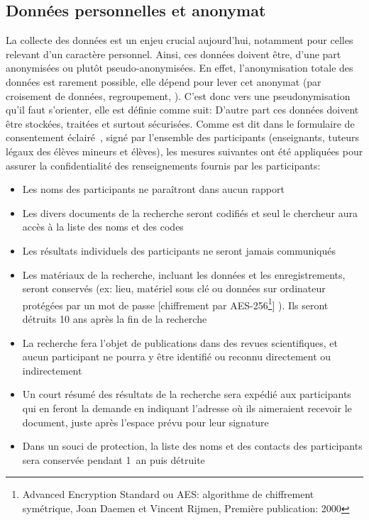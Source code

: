   \subsection{Données personnelles et anonymat}\label{sec:data}
    La collecte des données est un enjeu crucial aujourd'hui, notamment pour celles relevant d'un caractère personnel. Ainsi, ces données doivent être, d'une part anonymisées ou plutôt pseudo-anonymisées. En effet, l'anonymisation totale des données est rarement possible, elle dépend  pour lever cet anonymat (\eg par croisement de données, regroupement, \etc). C'est donc vers une pseudonymisation qu'il faut s'orienter, elle est définie comme suit:
    D'autre part ces données doivent être stockées, traitées et surtout sécurisées. Comme est dit dans le formulaire de consentement éclairé~, signé par l'ensemble des participants (enseignants, tuteurs légaux des élèves mineurs et élèves), les mesures suivantes ont été appliquées pour assurer la confidentialité des renseignements fournis par les participants:
    \begin{itemize}\myItemStyle
        \item Les noms des participants ne paraîtront dans aucun rapport
        \item Les divers documents de la recherche seront codifiés et seul le chercheur aura accès à  la liste des noms et des codes
        \item Les résultats individuels des participants ne seront jamais communiqués 
        \item Les matériaux de la recherche, incluant les données et les enregistrements, seront conservés (ex:  lieu, matériel sous clé ou données sur ordinateur protégées par un mot de passe [chiffrement par AES-256\footnote{Advanced Encryption Standard ou AES: algorithme de chiffrement symétrique, Joan Daemen et Vincent Rijmen, Première publication: 2000}] ). Ils seront détruits 10 ans après la fin de la recherche 
        \item La recherche fera l'objet de publications dans des revues scientifiques, et aucun participant ne pourra y être identifié ou reconnu directement ou indirectement 
        \item Un court résumé des résultats de la recherche sera expédié aux participants qui en feront la demande en indiquant l’adresse où ils aimeraient recevoir le document, juste après l’espace prévu pour leur signature 
        \item Dans un souci de protection, la liste des noms et des contacts des participants sera conservée pendant 1~an puis détruite
    \end{itemize}\par%
